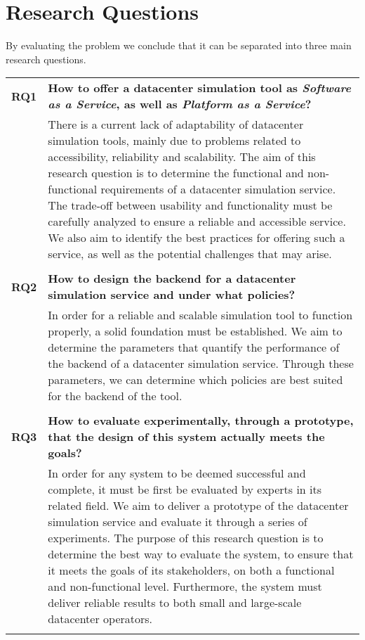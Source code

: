 \section{Research Questions} \label{sec:research-questions}

By evaluating the problem we conclude that it can be separated into three main research questions.

\begin{table}[H]
    \centering
    \begin{tabularx}{\textwidth}{lX}
        \textbf{RQ1} & \textbf{How to offer a datacenter simulation tool as \textit{Software as a Service}, as well as \textit{Platform as a Service}?} \\
        & There is a current lack of adaptability of datacenter simulation tools, mainly due to problems related to accessibility, reliability and scalability.
        The aim of this research question is to determine the functional and non-functional requirements of a datacenter simulation service.
        The trade-off between usability and functionality must be carefully analyzed to ensure a reliable and accessible service.
        We also aim to identify the best practices for offering such a service, as well as the potential challenges that may arise.
        \\\\

        \textbf{RQ2} & \textbf{How to design the backend for a datacenter simulation service and under what policies?} \\
        & In order for a reliable and scalable simulation tool to function properly, a solid foundation must be established.
        We aim to determine the parameters that quantify the performance of the backend of a datacenter simulation service.
        Through these parameters, we can determine which policies are best suited for the backend of the tool.
        \\\\

        \textbf{RQ3} & \textbf{How to evaluate experimentally, through a prototype, that the design of this system actually meets the goals?} \\
        & In order for any system to be deemed successful and complete, it must be first be evaluated by experts in its related field.
        We aim to deliver a prototype of the datacenter simulation service and evaluate it through a series of experiments.
        The purpose of this research question is to determine the best way to evaluate the system, to ensure that it meets the goals of its stakeholders, on both a functional and non-functional level.
        Furthermore, the system must deliver reliable results to both small and large-scale datacenter operators.
        \\\\
    \end{tabularx}
    \label{tab:research-questions}
\end{table}